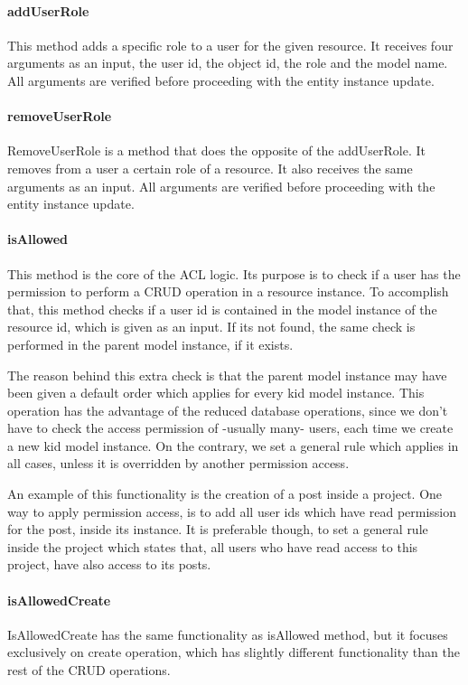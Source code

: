 \paragraph{addUserRole}
This method adds a specific role to a user for the given resource. It receives four arguments as an input, the user id, the object id, the role and the model name. All arguments are verified before proceeding with the entity instance update.
\paragraph{removeUserRole}
RemoveUserRole is a method that does the opposite of the addUserRole. It removes from a user a certain role of a resource. It also receives the same arguments as an input. All arguments are verified before proceeding with the entity instance update.
\paragraph{isAllowed}
This method is the core of the ACL logic. Its purpose is to check if  a user has the permission to perform a CRUD operation in a resource instance. To accomplish that, this method checks if a user id is contained in the model instance of the resource id, which is given as an input. If its not found, the same check is performed in the parent model instance, if it exists. \par 
	The reason behind this extra check is that the parent model instance may have been given a default order which applies for every kid model instance. This operation has the advantage of the reduced database operations, since we don't have to check the access permission of -usually many- users, each time we create a new kid model instance. On the contrary, we set a general rule which applies in all cases, unless it is overridden by another permission access. \par
	An example of this functionality is the creation of a post inside a project. One way to apply permission access, is to add all user ids which have read permission for the post, inside its instance. It is preferable though, to set a general rule inside the project which states that, all users who have read access to this project, have also access to its posts.

\paragraph{isAllowedCreate}
IsAllowedCreate has the same functionality as isAllowed method, but it focuses exclusively on create operation, which has slightly different functionality than the rest of the CRUD operations.

